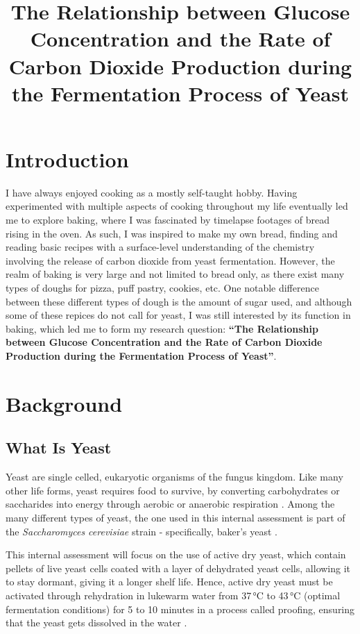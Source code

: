 \documentclass{article}
\title{\textbf{The Relationship between Glucose Concentration and the Rate of Carbon Dioxide Production during the Fermentation Process of Yeast}}
\author{}
\date{}
\begin{document}
\maketitle
\newpage
{}

\section{Introduction}
I have always enjoyed cooking as a mostly self-taught hobby. Having experimented with multiple aspects of cooking throughout my life eventually led me to explore baking, where I was fascinated by timelapse footages of bread rising in the oven. As such, I was inspired to make my own bread, finding and reading basic recipes with a surface-level understanding of the chemistry involving the release of carbon dioxide from yeast fermentation. However, the realm of baking is very large and not limited to bread only, as there exist many types of doughs for pizza, puff pastry, cookies, etc. One notable difference between these different types of dough is the amount of sugar used, and although some of these repices do not call for yeast, I was still interested by its function in baking, which led me to form my research question: \textbf{``The Relationship between Glucose Concentration and the Rate of Carbon Dioxide Production during the Fermentation Process of Yeast''}.

\section{Background}

\subsection{What Is Yeast}
Yeast are single celled, eukaryotic organisms of the fungus kingdom. Like many other life forms, yeast requires food to survive, by converting carbohydrates or saccharides into energy through aerobic or anaerobic respiration \parencite{ref}. Among the many different types of yeast, the one used in this internal assessment is part of the \emph{Saccharomyces cerevisiae} strain - specifically, baker's yeast \parencite{ref}.

\medskip

This internal assessment will focus on the use of active dry yeast, which contain pellets of live yeast cells coated with a layer of dehydrated yeast cells, \parencite{ref} allowing it to stay dormant, giving it a longer shelf life. Hence, active dry yeast must be activated through rehydration in lukewarm water from 37\,\si{\celsius} to 43\,\si{\celsius} (optimal fermentation conditions) for 5 to 10 minutes in a process called proofing, ensuring that the yeast gets dissolved in the water \parencite{ref}.
\end{document}
